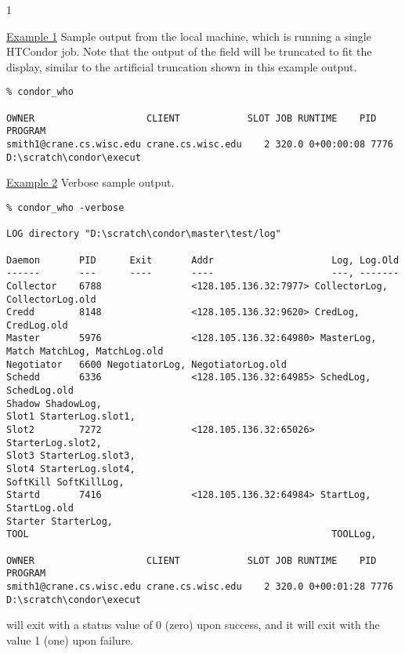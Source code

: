 \begin{ManPage}{\label{man-condor-who}}{1}
\Examples

\underline{Example 1} Sample output from the local machine,
which is running a single HTCondor job.
Note that the output of the  field will be truncated
to fit the display, similar to the artificial truncation shown in this 
example output.
\footnotesize
\begin{verbatim}
% condor_who 

OWNER                    CLIENT            SLOT JOB RUNTIME    PID    PROGRAM
smith1@crane.cs.wisc.edu crane.cs.wisc.edu    2 320.0 0+00:00:08 7776 D:\scratch\condor\execut
\end{verbatim}
\normalsize

\underline{Example 2} Verbose sample output.
\footnotesize
\begin{verbatim}
% condor_who -verbose

LOG directory "D:\scratch\condor\master\test/log"

Daemon       PID      Exit       Addr                     Log, Log.Old
------       ---      ----       ----                     ---, -------
Collector    6788                <128.105.136.32:7977> CollectorLog, CollectorLog.old
Credd        8148                <128.105.136.32:9620> CredLog, CredLog.old
Master       5976                <128.105.136.32:64980> MasterLog,
Match MatchLog, MatchLog.old
Negotiator   6600 NegotiatorLog, NegotiatorLog.old
Schedd       6336                <128.105.136.32:64985> SchedLog, SchedLog.old
Shadow ShadowLog,
Slot1 StarterLog.slot1,
Slot2        7272                <128.105.136.32:65026> StarterLog.slot2,
Slot3 StarterLog.slot3,
Slot4 StarterLog.slot4,
SoftKill SoftKillLog,
Startd       7416                <128.105.136.32:64984> StartLog, StartLog.old
Starter StarterLog,
TOOL                                                      TOOLLog,

OWNER                    CLIENT            SLOT JOB RUNTIME    PID    PROGRAM
smith1@crane.cs.wisc.edu crane.cs.wisc.edu    2 320.0 0+00:01:28 7776 D:\scratch\condor\execut
\end{verbatim}
\normalsize

\ExitStatus

 will exit with a status value of 0 (zero) upon success,
and it will exit with the value 1 (one) upon failure.

\end{ManPage}

